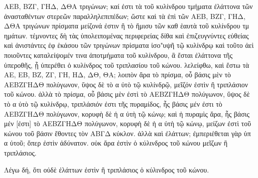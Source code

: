 \begin{Parallel}{}{}
{{ΑΕΒ, ΒΖΓ, ΓΗΔ, ΔΘΑ τριγώνων;  καί ἐστι τὰ τοῦ κυλίνδρου τμήματα ἐλάττονα τῶν ἀνασταθέντων
στερεῶν παραλληλεπιπέδων; ὥστε καὶ τὰ ἐπὶ τῶν ΑΕΒ, ΒΖΓ, ΓΗΔ, ΔΘΑ τριγώνων πρίσματα μείζονά
ἐστιν ἢ τὸ ἥμισυ τῶν καθ ἑαυτὰ τοῦ κυλίνδρου τμ ημάτων. τέμνοντες δὴ τὰς ὑπολειπομένας περιφερείας
δίθα καὶ ἐπιζευγνύντες εὐθείας καὶ ἀνιστάντες 
ἐφ ἑκάσου τῶν τριγώνων πρίσματα ἰσο"υψῆ τῷ κυλίνδρῳ καὶ τοῦτο ἀεὶ ποιοῦντες καταλείψομέν
τινα ἀποτμήματα τοῦ κυλίνδρου, ἃ ἔσται ἐλάττονα τῆς ὑπεροθῆς, ᾗ ὑπερέθει ὁ κυλίνδρος τοῦ
τριπλασίου τοῦ κώνου. λελείφθω, καὶ ἔστω τὰ ΑΕ, ΕΒ, ΒΖ, ΖΓ, ΓΗ, ΗΔ, ΔΘ, ΘΑ; λοιπὸν ἄρα τὸ πρίσμα, οὗ
βάσις μὲν τὸ ΑΕΒΖΓΗΔΘ πολύγωνον, ὕψος δὲ τὸ α ὐτὸ τῷ κυλίνδρῷ, μεῖζόν ἐστὶν ἢ
τριπλάσιον τοῦ κώνου. 
ἀλλὰ τὸ πρίσμα, οὗ βάσις μὲν ἐστὶ τὸ ΑΕΒΖΓΗΔΘ πολύγωνον, ὕψος δὲ τὸ α ὐτὸ τῷ κυλίνδρῳ, τριπλάσιόν
ἐστι τῆς πυραμίδος, ἧς βάσις μέν ἐστι τὸ ΑΕΒΖΓΗΔΘ
πολύγωνον, 
κορυφὴ δὲ
ἡ α ὐτὴ τῷ κώνῳ; καὶ ἡ πυραμὶς ἄρα, ἧς βάσις μέν [ἐστι] τὸ ΑΕΒΖΓΗΔΘ πολύγωνον, κορυφὴ
δὲ ἡ α ὐτὴ τῷ κώνῳ, μείζων ἐστὶ τοῦ κώνου τοῦ βάσιν ἔθοντες τὸν ΑΒΓΔ κύκλον.
 ἀλλὰ καὶ
ἐλάττων; ἐμπεριέθεται γὰρ ὑπ α ὐτοῦ; ὅπερ ἐστὶν ἀδύνατον. οὐκ ἄρα ἐστὶν ὁ κύλινδρος
τοῦ κώνου μεῖζων ἢ τριπλάσιος.}

{\greekfont Λέγω δή,  ὅτι οὐδὲ ἐλάττων ἐστὶν ἢ τριπλάσιος ὁ κύλινδρος τοῦ κώνου.}

}
\end{Parallel}
